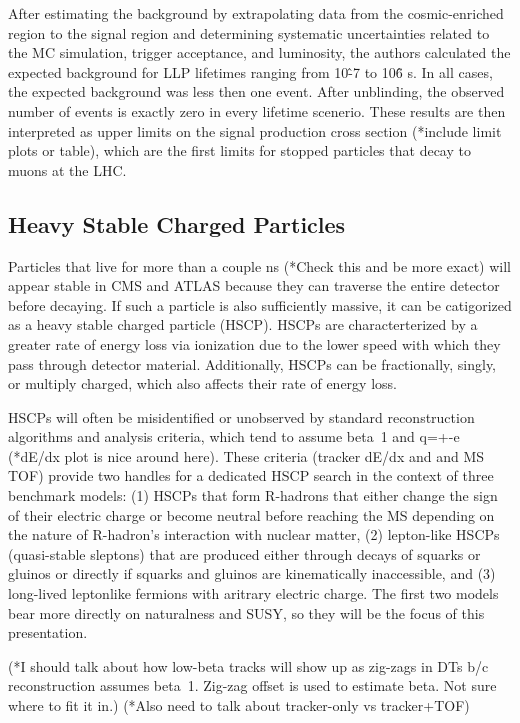 \documentclass[12pt]{article}
\begin{document}
    After estimating the background by extrapolating data from the cosmic-enriched region to the signal region and determining systematic uncertainties related to the MC simulation, trigger acceptance, and luminosity, the authors calculated the expected background for LLP lifetimes ranging from 10\^-7 to 10\^6 s. In all cases, the expected background was less then one event. After unblinding, the observed number of events is exactly zero in every lifetime scenerio. These results are then interpreted as upper limits on the signal production cross section (*include limit plots or table), which are the first limits for stopped particles that decay to muons at the LHC.

\subsection{Heavy Stable Charged Particles}
    Particles that live for more than a couple ns (*Check this and be more exact) will appear stable in CMS and ATLAS because they can traverse the entire detector before decaying. If such a particle is also sufficiently massive, it can be catigorized as a heavy stable charged particle (HSCP). HSCPs are characterterized by a greater rate of energy loss via ionization due to the lower speed with which they pass through detector material. Additionally, HSCPs can be fractionally, singly, or multiply charged, which also affects their rate of energy loss. 

    HSCPs will often be misidentified or unobserved by standard reconstruction algorithms and analysis criteria, which tend to assume beta~1 and q=+-e (*dE/dx plot is nice around here). These criteria (tracker dE/dx and and MS TOF) provide two handles for a dedicated HSCP search in the context of three benchmark models: (1) HSCPs that form R-hadrons that either change the sign of their electric charge or become neutral before reaching the MS depending on the nature of R-hadron's interaction with nuclear matter, (2) lepton-like HSCPs (quasi-stable sleptons) that are produced either through decays of squarks or gluinos or directly if squarks and gluinos are kinematically inaccessible, and (3) long-lived leptonlike fermions with aritrary electric charge. The first two models bear more directly on naturalness and SUSY, so they will be the focus of this presentation.

    (*I should talk about how low-beta tracks will show up as zig-zags in DTs b/c reconstruction assumes beta~1. Zig-zag offset is used to estimate beta. Not sure where to fit it in.) (*Also need to talk about tracker-only vs tracker+TOF)
\end{document}
